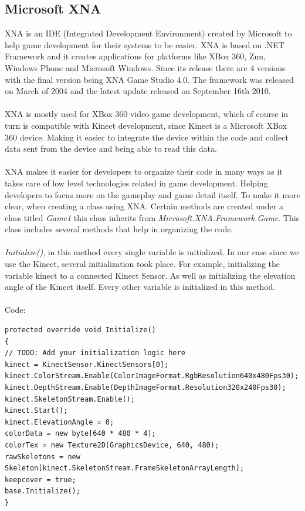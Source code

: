 \subsection{Microsoft XNA}
XNA is an IDE (Integrated Development Environment) created by Microsoft to help game development for their systems to be easier. XNA is based on .NET Framework and it creates applications for platforms like XBox 360, Zun, Windows Phone and Microsoft Windows. Since its release there are 4 versions with the final version being XNA Game Studio 4.0. The framework was released on March of 2004 and the latest update released on September 16th 2010.
\\
\\
XNA is mostly used for XBox 360 video game development, which of course in turn is compatible with Kinect development, since Kinect is a Microsoft XBox 360 device. Making it easier to integrate the device within the code and collect data sent from the device and being able to read this data.
\\
\\
XNA makes it easier for developers to organize their code in many ways as it takes care of low level technologies related in game development. Helping developers to focus more on the gameplay and game detail itself. To make it more clear, when creating a class using XNA. Certain methods are created under a class titled \emph{Game1} this class inherits from \emph{Microsoft.XNA.Framework.Game}. This class includes several methods that help in organizing the code.
\\
\\
\emph{Initialize()}, in this method every single variable is initialized. In our case since we use the Kinect, several initialization took place. For example, initializing the variable kinect to a connected Kinect Sensor. As well as initializing the elevation angle of the Kinect itself. Every other variable is initialized in this method.
\\
\\
Code:
\begin{verbatim}
protected override void Initialize()
{
// TODO: Add your initialization logic here
kinect = KinectSensor.KinectSensors[0];
kinect.ColorStream.Enable(ColorImageFormat.RgbResolution640x480Fps30);
kinect.DepthStream.Enable(DepthImageFormat.Resolution320x240Fps30);
kinect.SkeletonStream.Enable();
kinect.Start();
kinect.ElevationAngle = 0;
colorData = new byte[640 * 480 * 4];
colorTex = new Texture2D(GraphicsDevice, 640, 480);
rawSkeletons = new Skeleton[kinect.SkeletonStream.FrameSkeletonArrayLength];
keepcover = true;
base.Initialize();
}
\end{verbatim}
